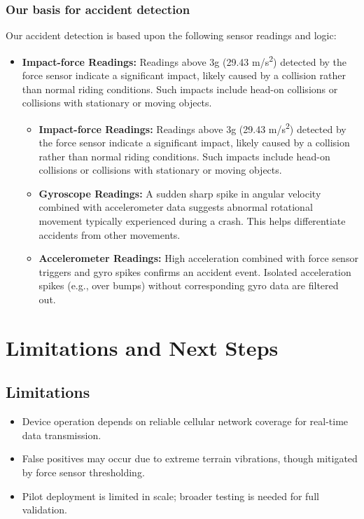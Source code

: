 \documentclass[12pt]{article}
\begin{document}
\subsubsection{Our basis for accident detection}
Our accident detection is based upon the following sensor readings and logic:

\begin{itemize}
  \item \textbf{Impact-force Readings:}  
  Readings above 3g (29.43 m/s\textsuperscript{2}) detected by the force sensor indicate a significant impact, likely caused by a collision rather than normal riding conditions. Such impacts include head-on collisions or collisions with stationary or moving objects.
  \begin{itemize}
  \item \textbf{Impact-force Readings:}  
  Readings above 3g (29.43 m/s\textsuperscript{2}) detected by the force sensor indicate a significant impact, likely caused by a collision rather than normal riding conditions. Such impacts include head-on collisions or collisions with stationary or moving objects.
  
  \item \textbf{Gyroscope Readings:}  
  A sudden sharp spike in angular velocity combined with accelerometer data suggests abnormal rotational movement typically experienced during a crash. This helps differentiate accidents from other movements.
   \item \textbf{Accelerometer Readings:}  
  High acceleration combined with force sensor triggers and gyro spikes confirms an accident event. Isolated acceleration spikes (e.g., over bumps) without corresponding gyro data are filtered out.
\end{itemize}

\end{itemize}


\section{Limitations and Next Steps}

\subsection{Limitations}
\begin{itemize}
  \item Device operation depends on reliable cellular network coverage for real-time data transmission.
  \item False positives may occur due to extreme terrain vibrations, though mitigated by force sensor thresholding.
  \item Pilot deployment is limited in scale; broader testing is needed for full validation.
\end{itemize}
\end{document}
